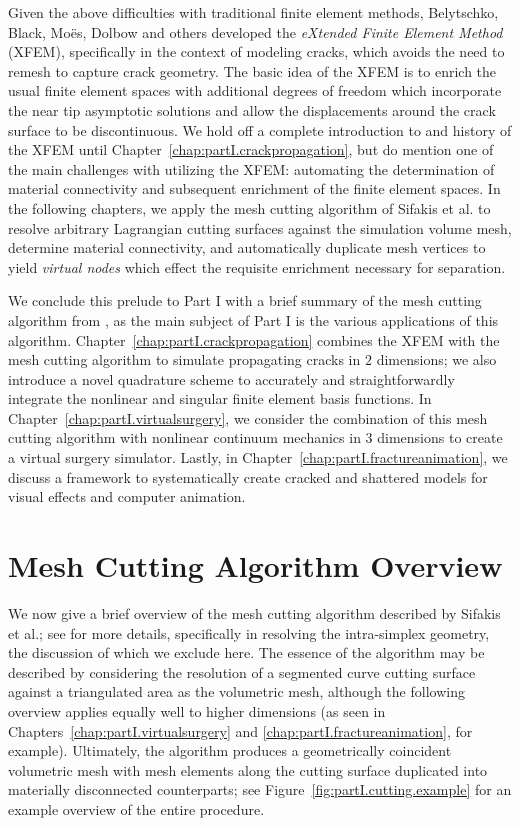 Given the above difficulties with traditional finite element methods, Belytschko, Black, Mo\"{e}s, Dolbow \cite{Belytschko99, Moes99} and others developed the \emph{eXtended Finite Element Method} (XFEM), specifically in the context of modeling cracks, which avoids the need to remesh to capture crack geometry. The basic idea of the XFEM is to enrich the usual finite element spaces with additional degrees of freedom which incorporate the near tip asymptotic solutions and allow the displacements around the crack surface to be discontinuous. We hold off a complete introduction to and history of the XFEM until Chapter~\ref{chap:partI.crackpropagation}, but do mention one of the main challenges with utilizing the XFEM: automating the determination of material connectivity and subsequent enrichment of the finite element spaces. In the following chapters, we apply the mesh cutting algorithm of Sifakis et al. \cite{Sifakis07} to resolve arbitrary Lagrangian cutting surfaces against the simulation volume mesh, determine material connectivity, and automatically duplicate mesh vertices to yield \emph{virtual nodes} which effect the requisite enrichment necessary for separation.

We conclude this prelude to Part I with a brief summary of the mesh cutting algorithm from \cite{Sifakis07}, as the main subject of Part I is the various applications of this algorithm. Chapter~\ref{chap:partI.crackpropagation} combines the XFEM with the mesh cutting algorithm to simulate propagating cracks in $2$ dimensions; we also introduce a novel quadrature scheme to accurately and straightforwardly integrate the nonlinear and singular finite element basis functions. In Chapter~\ref{chap:partI.virtualsurgery}, we consider the combination of this mesh cutting algorithm with nonlinear continuum mechanics in $3$ dimensions to create a virtual surgery simulator. Lastly, in Chapter~\ref{chap:partI.fractureanimation}, we discuss a framework to systematically create cracked and shattered models for visual effects and computer animation.

\section*{Mesh Cutting Algorithm Overview}

We now give a brief overview of the mesh cutting algorithm described by Sifakis et al.; see \cite{Sifakis07} for more details, specifically in resolving the intra-simplex geometry, the discussion of which we exclude here. The essence of the algorithm may be described by considering the resolution of a segmented curve cutting surface against a triangulated area as the volumetric mesh, although the following overview applies equally well to higher dimensions (as seen in Chapters~\ref{chap:partI.virtualsurgery} and \ref{chap:partI.fractureanimation}, for example). Ultimately, the algorithm produces a geometrically coincident volumetric mesh with mesh elements along the cutting surface duplicated into materially disconnected counterparts; see Figure~\ref{fig:partI.cutting.example} for an example overview of the entire procedure.

